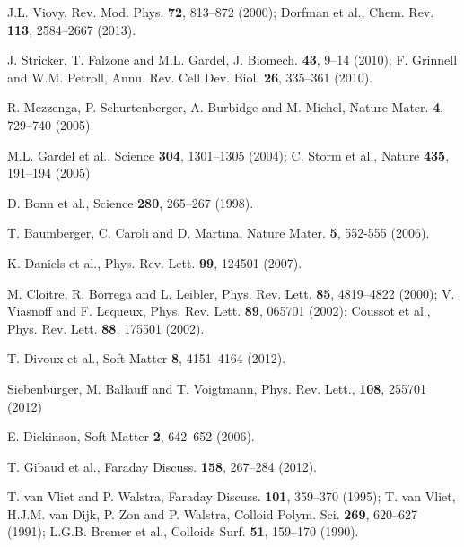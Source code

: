 \documentclass[twocolumn,superscriptaddress,showpacs,preprintnumbers,amsmath,amssymb,prl]{revtex4}
\begin{document}
\begin{thebibliography}{}

 J.L. Viovy, Rev. Mod. Phys. {\bf 72}, 813--872 (2000); Dorfman et al., Chem. Rev. {\bf 113}, 2584--2667 (2013).

 J. Stricker, T. Falzone and M.L. Gardel, J. Biomech. {\bf 43},  9--14 (2010); F. Grinnell and W.M. Petroll, Annu. Rev. Cell Dev. Biol. {\bf 26}, 335--361 (2010).

 R. Mezzenga, P. Schurtenberger, A. Burbidge and M. Michel, Nature Mater.  {\bf 4}, 729--740 (2005).

 M.L. Gardel et al., Science {\bf 304}, 1301--1305 (2004); C. Storm et al., Nature {\bf 435}, 191--194 (2005)

 D. Bonn et al., Science {\bf 280}, 265--267 (1998).

 T. Baumberger, C. Caroli and D. Martina, Nature Mater. {\bf 5}, 552-555 (2006).

 K. Daniels et al., Phys. Rev. Lett. {\bf 99}, 124501 (2007).


 M. Cloitre, R. Borrega and L. Leibler, Phys. Rev. Lett. {\bf 85}, 4819--4822 (2000); V. Viasnoff and F. Lequeux, Phys. Rev. Lett. {\bf 89}, 065701 (2002); Coussot et al., Phys. Rev. Lett. {\bf 88}, 175501 (2002).

 T. Divoux et al., Soft Matter {\bf 8}, 4151--4164 (2012).

 Siebenb\"urger, M. Ballauff and T. Voigtmann, Phys. Rev.
Lett., {\bf 108}, 255701 (2012)

 E. Dickinson, Soft Matter {\bf 2}, 642--652 (2006).

 T. Gibaud et al., Faraday Discuss. {\bf 158}, 267--284 (2012).


 T. van Vliet and P. Walstra, Faraday Discuss. {\bf 101}, 359--370 (1995); T. van Vliet, H.J.M. van Dijk, P. Zon and P. Walstra, Colloid Polym. Sci. {\bf 269}, 620--627 (1991); L.G.B. Bremer et al., Colloids Surf. {\bf 51}, 159--170 (1990).


\end{thebibliography}
\end{document}
